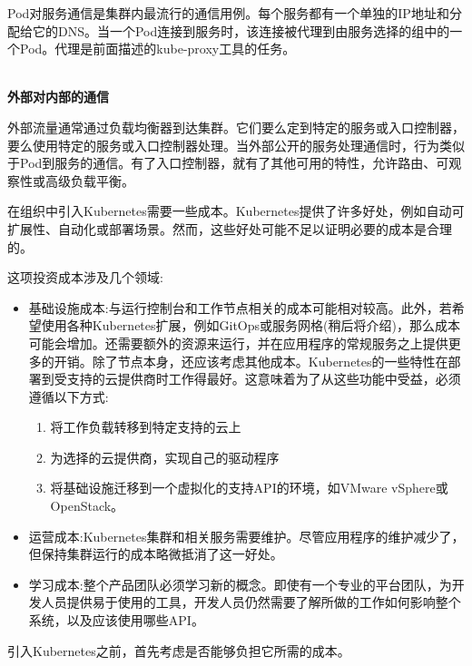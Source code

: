 Pod对服务通信是集群内最流行的通信用例。每个服务都有一个单独的IP地址和分配给它的DNS。当一个Pod连接到服务时，该连接被代理到由服务选择的组中的一个Pod。代理是前面描述的kube-proxy工具的任务。

\hspace*{\fill} \\ %
\noindent
\textbf{外部对内部的通信}

外部流量通常通过负载均衡器到达集群。它们要么定到特定的服务或入口控制器，要么使用特定的服务或入口控制器处理。当外部公开的服务处理通信时，行为类似于Pod到服务的通信。有了入口控制器，就有了其他可用的特性，允许路由、可观察性或高级负载平衡。


在组织中引入Kubernetes需要一些成本。Kubernetes提供了许多好处，例如自动可扩展性、自动化或部署场景。然而，这些好处可能不足以证明必要的成本是合理的。

这项投资成本涉及几个领域:

\begin{itemize}
\item 
基础设施成本:与运行控制台和工作节点相关的成本可能相对较高。此外，若希望使用各种Kubernetes扩展，例如GitOps或服务网格(稍后将介绍)，那么成本可能会增加。还需要额外的资源来运行，并在应用程序的常规服务之上提供更多的开销。除了节点本身，还应该考虑其他成本。Kubernetes的一些特性在部署到受支持的云提供商时工作得最好。这意味着为了从这些功能中受益，必须遵循以下方式:

\begin{enumerate}[label=\alph*]
\item 
将工作负载转移到特定支持的云上

\item
为选择的云提供商，实现自己的驱动程序

\item
将基础设施迁移到一个虚拟化的支持API的环境，如VMware vSphere或OpenStack。
\end{enumerate}

\item 
运营成本:Kubernetes集群和相关服务需要维护。尽管应用程序的维护减少了，但保持集群运行的成本略微抵消了这一好处。

\item 
学习成本:整个产品团队必须学习新的概念。即使有一个专业的平台团队，为开发人员提供易于使用的工具，开发人员仍然需要了解所做的工作如何影响整个系统，以及应该使用哪些API。
\end{itemize}

引入Kubernetes之前，首先考虑是否能够负担它所需的成本。












